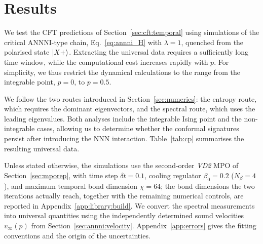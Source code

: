 \FloatBarrier
\section{Results}
\label{sec:results}

We test the \ac{CFT} predictions of Section~\ref{sec:cft:temporal} using simulations of the critical \ac{ANNNI}-type chain, Eq.~\eqref{eq:annni_H} with $\lambda=1$, quenched from the polarised state $\ket{X+}$. Extracting the universal data requires a sufficiently long time window, while the computational cost increases rapidly with $p$. For simplicity, we thus restrict the dynamical calculations to the range from the integrable point, $p=0$, to $p=0.5$.

We follow the two routes introduced in Section~\ref{sec:numerics}: the entropy route, which requires the dominant eigenvectors, and the spectral route, which uses the leading eigenvalues. Both analyses include the integrable Ising point and the non-integrable cases, allowing us to determine whether the conformal signatures persist after introducing the \ac{NNN} interaction. Table~\ref{tab:cp} summarises the resulting universal data.

Unless stated otherwise, the simulations use the second-order \textit{VD2} \ac{MPO} of Section~\ref{sec:mporep}, with time step $\delta t=0.1$, cooling regulator $\beta_0=0.2$ ($N_\beta=4$), and maximum temporal bond dimension $\chi=64$; the bond dimensions the two iterations actually reach, together with the remaining numerical controls, are reported in Appendix~\ref{app:library:build}. We convert the spectral measurements into universal quantities using the independently determined sound velocities $v_\infty(p)$ from Section~\ref{sec:annni:velocity}. Appendix~\ref{app:errors} gives the fitting conventions and the origin of the uncertainties.

